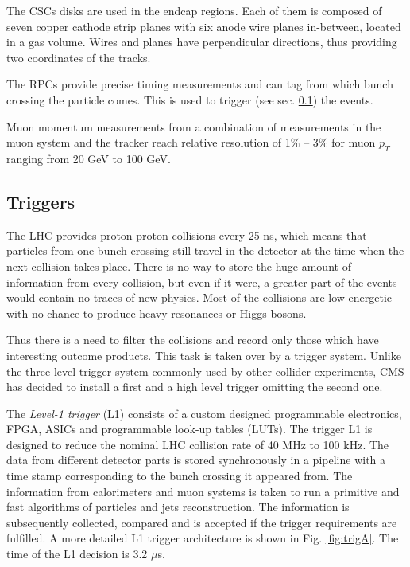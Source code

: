 The CSCs disks are used in the endcap regions. Each of them is composed of seven copper cathode strip planes with six anode wire planes in-between, located in 
a gas volume. Wires and planes have perpendicular directions, thus providing two coordinates of the tracks.

The RPCs provide precise timing measurements and can tag from which bunch crossing the particle comes. This is used to trigger (see sec. \ref{sec:trig})
the events.

Muon momentum measurements from a combination of measurements in the muon system and the tracker reach relative resolution of 1$\%$ -- 3$\%$ for muon $p_{T}$
ranging from 20 GeV to 100 GeV.

\subsection{Triggers}\label{sec:trig}

The LHC provides proton-proton collisions every 25 ns, which means that particles from one bunch crossing still travel in the detector at 
the time when the next collision takes place. There is no way to store the huge amount of information from every collision, but even if it were,
a greater part of the events would contain no traces of new physics. Most of the collisions are low energetic with no chance
to produce heavy resonances or Higgs bosons.

Thus there is a need to filter the collisions and record only those which have interesting outcome products. This task is taken over by a trigger
system\cite{CMSatLHC}. Unlike the three-level trigger system commonly used by other collider experiments, CMS has decided to install a first and a high
level trigger omitting the second one.

The \textit{Level-1 trigger} (L1) consists of a custom designed programmable electronics, FPGA, ASICs and programmable look-up tables (LUTs).
The trigger L1 is designed to reduce the nominal LHC collision rate of 40 MHz to 100 kHz. The data from different detector parts is stored
synchronously in a pipeline with a time stamp corresponding to the bunch crossing it appeared from. The information from calorimeters and muon systems is taken to run a primitive
and fast algorithms of particles and jets reconstruction. The information is subsequently collected, compared and is accepted if the trigger
requirements are fulfilled. A more detailed L1 trigger architecture is shown in Fig. \ref{fig:trigA}. The time of the L1 decision is 3.2 $\mu$s. 

